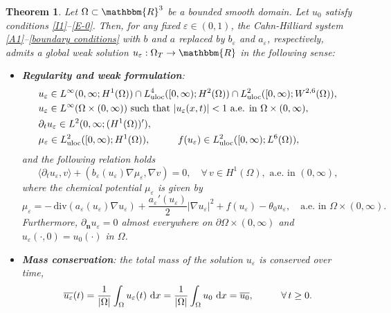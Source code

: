 \documentclass[11pt,  reqno]{amsart}%
\theoremstyle{plain}
\newtheorem{theorem}{Theorem}[section]
\theoremstyle{definition}
\theoremstyle{remark}
\numberwithin{equation}{section}
\newcommand{\ve}{\varepsilon}
\def\div{\,\mathrm{div}}
\newcommand{\dx}{\textup{d}x}
\begin{document}
	\begin{theorem} \label{Ex Weak App}
		Let $\Omega \subset \mathbbm{R}^3$ be a bounded smooth domain. Let $u_0$ satisfy conditions \eqref{I1}--\eqref{E-0}. 
		Then, for any fixed $\varepsilon \in (0,1)$, the Cahn-Hilliard system \eqref{A1}--\eqref{boundary conditions} with $b$ and $a$ replaced by $b_{\ve}$ and $a_{\ve}$, respectively,
		admits a global weak solution $u_{\ve}: \Omega_T \to \mathbbm{R}$ in the following sense:
		\begin{itemize}
			\item[(i)]  \textbf{Regularity and weak formulation}: 
			\begin{subequations} \label{B1}
				\begin{align}
					&u_{\ve} \in L^\infty(0,\infty; H^1(\Omega))\cap L^4_{\rm uloc}([0,\infty); H^2(\Omega))\cap L^2_{\rm uloc}([0,\infty); W^{2,6}(\Omega)), \label{B1.1}\\
					&u_{\ve} \in L^\infty(\Omega \times (0,\infty)) \textrm{ such that } |u_{\ve}(x,t)|<1 \textrm{ a.e. in }\Omega \times (0,\infty),  \label{B1.2}\\
					 &\partial _t u_{\ve} \in L^2(0,\infty; (H^{1}(\Omega))'),\\
                     &\mu_{\ve} \in L^2_{\rm uloc}([0,\infty); H^{1}(\Omega)), \hspace{1.0 cm}f(u_{\ve}) \in L^2_{\rm uloc}([0,\infty); L^{6}(\Omega)),
                     \label{B1.3}
				\end{align}
			\end{subequations}
 and the following relation holds
           \begin{equation}
               \label{ueps}
               \langle \partial_t u_{\ve},v \rangle + (b_{\ve}(u_{\ve})\nabla \mu_{\ve}, \nabla v)=0, \quad\forall \, v \in H^1(\Omega), \textrm{ a.e. in }(0,\infty),
           \end{equation}
where the chemical potential $\mu_{\ve}$ is given by
            \begin{equation}
            \label{mueps}
                \mu_{\ve}= -\div (a_{\ve}(u_{\ve})\nabla u_{\ve})+ \dfrac{a_{\ve}'(u_{\ve})}{2} |\nabla u_{\ve}|^2+f(u_{\ve})-\theta_0 u_{\ve}, \quad \textrm{a.e. in }\Omega \times (0,\infty).
            \end{equation}
            Furthermore, $\partial_{\mathbf{n}}u_{\ve}=0$ almost everywhere on $\partial \Omega \times (0,\infty)$ and $u_{\ve}(\cdot , 0)= u_0(\cdot)$ in $\Omega$. 
            
            \vspace{0.05cm}
			\item[(ii)] \textbf{Mass conservation}: the total mass of the solution $u_\ve$ is conserved over time, 
            \begin{equation}
                \label{massueps}
                \overline{u_{\ve}}(t)= \dfrac{1}{|\Omega|}\int_{\Omega} u_{\ve}(t) \ \dx = \dfrac{1}{|\Omega|}\int_{\Omega} u_0 \ \dx = \overline{u_0}, \hspace{1.0 cm}\forall \, t \ge 0.
            \end{equation}
            

\end{itemize}
\end{theorem}
\end{document}
